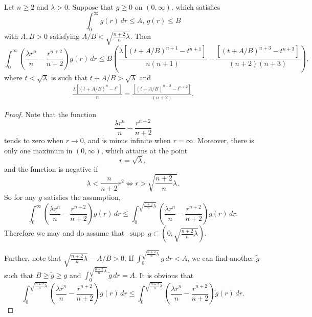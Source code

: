 \documentclass[10pt,a4paper]{amsart}
\def\supp{{\mathop\mathrm{\,supp\,}}}
\begin{document}
\begin{lem}\label{lem-3}
Let $n\ge 2$ and $\lambda>0$. Suppose that $g\ge 0$ on $(0,\infty)$, which satisfies
$$\int_0^\infty g(r)\,dr\le A,\, g(r)\le B$$
with $A,B>0$ satisfying $A/B<\sqrt{\frac{n+2}{n}\lambda}$.
Then
$$\int_0^\infty \left(\frac{\lambda r^n}{n} -\frac{r^{n+2}}{n+2}\right)g(r)\,dr\le B\left(\frac{\lambda \left[(t+A/B)^{n+1}-t^{n+1}\right]}{n(n+1)}-\frac{\left[(t+A/B)^{n+3}-t^{n+3}\right]}{(n+2)(n+3)}\right),$$
where  $t<\sqrt\lambda$  is such that $t+A/B>\sqrt{\lambda}$ and
\begin{align*}
\frac{\lambda \left[(t+A/B)^{n}-t^{n}\right]}{n}=\frac{\left[(t+A/B)^{n+2}-t^{n+2}\right]}{(n+2)}.
\end{align*}
\end{lem}

\begin{proof}
Note that the function
$$\frac{\lambda r^n}{n} -\frac{r^{n+2}}{n+2}$$
tends to zero when $r\to 0$, and is minus infinite when $r=\infty$.
Moreover, there is only one maximum in $(0,\infty)$, which attains at the point
$$r=\sqrt\lambda,$$
and the function is negative if
$$\lambda< \frac{n}{n+2}r^2\Longleftrightarrow r>\sqrt{\frac{n+2}{n}\lambda}.$$
So for any $g$ satisfies the assumption,
$$\int_0^\infty \left(\frac{\lambda r^n}{n} -\frac{r^{n+2}}{n+2}\right)g(r)\,dr\le \int_0^{\sqrt{\frac{n+2}{n}\lambda}} \left(\frac{\lambda r^n}{n} -\frac{r^{n+2}}{n+2}\right)g(r)\,dr.$$
Therefore we may and do assume that $\supp g\subset (0,\sqrt{\frac{n+2}{n}\lambda})$.

Further, note that $\sqrt{\frac{n+2}{n}\lambda}-A/B>0$.
If $\int_0^{\sqrt{\frac{n+2}{n}\lambda}}g\,dr<A$, we can find another $\tilde g$ such that
$B\ge \tilde g\ge g$ and $\int_0^{\sqrt{\frac{n+2}{n}\lambda}}\tilde g\,dr=A$. It is obvious that
$$\int_0^{\sqrt{\frac{n+2}{n}\lambda}} \left(\frac{\lambda r^n}{n} -\frac{r^{n+2}}{n+2}\right)g(r)\,dr\le \int_0^{\sqrt{\frac{n+2}{n}\lambda}} \left(\frac{\lambda r^n}{n} -\frac{r^{n+2}}{n+2}\right)\tilde g(r)\,dr.$$



\end{proof}
\end{document}
